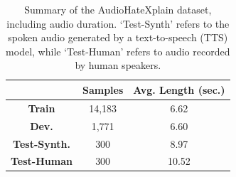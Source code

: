 \documentclass[11pt]{article}
\begin{document}




\begin{table}[t]
\centering
\begin{tabular}{ccc}
\hline
                     & \textbf{Samples}  & \textbf{Avg. Length (sec.)} \\ \hline
\textbf{Train}       & 14,183            & 6.62                        \\
\textbf{Dev.}        & 1,771             & 6.60                        \\ 
\textbf{Test-Synth.} & 300               & 8.97                        \\
\textbf{Test-Human}  & 300               & 10.52                       \\ \hline
\end{tabular}
\caption{Summary of the AudioHateXplain dataset, including audio duration. `Test-Synth' refers to the spoken audio generated by a text-to-speech (TTS) model, while `Test-Human' refers to audio recorded by human speakers.}
\label{tab:audiohatexplain}
\end{table}




\end{document}
